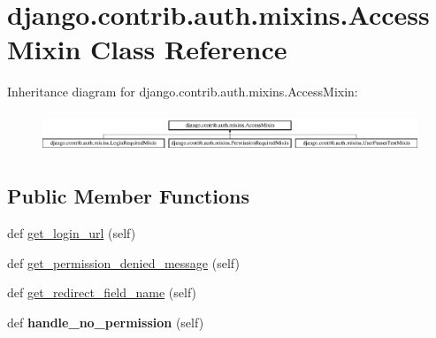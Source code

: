 \hypertarget{classdjango_1_1contrib_1_1auth_1_1mixins_1_1_access_mixin}{}\section{django.\+contrib.\+auth.\+mixins.\+Access\+Mixin Class Reference}
\label{classdjango_1_1contrib_1_1auth_1_1mixins_1_1_access_mixin}
Inheritance diagram for django.\+contrib.\+auth.\+mixins.\+Access\+Mixin\+:\begin{figure}[H]
\begin{center}
\leavevmode
\includegraphics[height=1.196581cm]{classdjango_1_1contrib_1_1auth_1_1mixins_1_1_access_mixin}
\end{center}
\end{figure}
\subsection*{Public Member Functions}
\begin{DoxyCompactItemize}
\item 
def \mbox{\hyperlink{classdjango_1_1contrib_1_1auth_1_1mixins_1_1_access_mixin_a809d11be83e8147b6b6b6fedb8318ef6}{get\+\_\+login\+\_\+url}} (self)
\item 
def \mbox{\hyperlink{classdjango_1_1contrib_1_1auth_1_1mixins_1_1_access_mixin_af50eab0d73f78c49d433dc770e157bbf}{get\+\_\+permission\+\_\+denied\+\_\+message}} (self)
\item 
def \mbox{\hyperlink{classdjango_1_1contrib_1_1auth_1_1mixins_1_1_access_mixin_abf988b609f1e927ea5b7ef262466b6ca}{get\+\_\+redirect\+\_\+field\+\_\+name}} (self)
\item 
\mbox{\label{classdjango_1_1contrib_1_1auth_1_1mixins_1_1_access_mixin_abd3b8d31ab32897ab2c1c32e70b0694a}} 
def {\bfseries handle\+\_\+no\+\_\+permission} (self)
\end{DoxyCompactItemize}
